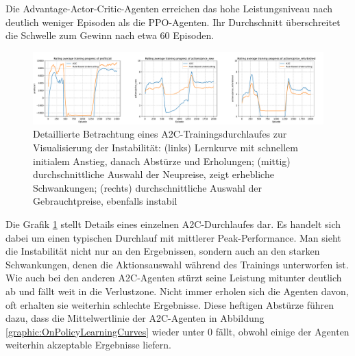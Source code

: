 Die Advantage-Actor-Critic-Agenten erreichen das hohe Leistungsniveau nach deutlich weniger Episoden als die PPO-Agenten.
Ihr Durchschnitt überschreitet die Schwelle zum Gewinn nach etwa 60 Episoden.
\begin{figure}[htb]
	\centering
	\includegraphics[width=\textwidth]{main/a2c_detailed_analysis.pdf}
	\caption{
		Detaillierte Betrachtung eines A2C-Trainingsdurchlaufes zur Visualisierung der Instabilität:
		(links) Lernkurve mit schnellem initialem Anstieg, danach Abstürze und Erholungen;
		(mittig) durchschnittliche Auswahl der Neupreise, zeigt erhebliche Schwankungen;
		(rechts) durchschnittliche Auswahl der Gebrauchtpreise, ebenfalls instabil
	}
	\label{graphic:A2CInstability}
\end{figure}
Die Grafik \ref{graphic:A2CInstability} stellt Details eines einzelnen A2C-Durchlaufes dar.
Es handelt sich dabei um einen typischen Durchlauf mit mittlerer Peak-Performance.
Man sieht die Instabilität nicht nur an den Ergebnissen, sondern auch an den starken Schwankungen, denen die Aktionsauswahl während des Trainings unterworfen ist.
Wie auch bei den anderen A2C-Agenten stürzt seine Leistung mitunter deutlich ab und fällt weit in die Verlustzone.
Nicht immer erholen sich die Agenten davon, oft erhalten sie weiterhin schlechte Ergebnisse.
Diese heftigen Abstürze führen dazu, dass die Mittelwertlinie der A2C-Agenten in Abbildung \ref{graphic:OnPolicyLearningCurves} wieder unter 0 fällt, obwohl einige der Agenten weiterhin akzeptable Ergebnisse liefern.

